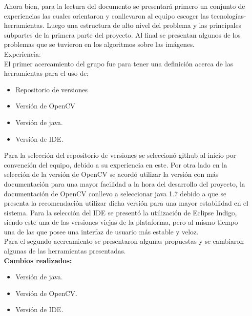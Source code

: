 \documentclass{report}
\begin{document}
Ahora bien, para la lectura del documento se presentar\'a primero un conjunto de experiencias las cuales orientaron y conllevaron al equipo escoger las tecnolog\'ias-herramientas. Luego una estructura de alto nivel del problema y las principales subpartes de la primera parte del proyecto. Al final se presentan algunos de los problemas que se tuvieron en los algoritmos sobre las im\'agenes.\\ [3 cm]

\huge  Experiencia:\\

\large 
El primer acercamiento del grupo fue para tener una definici\'on acerca de las herramientas para el uso de: \\

\begin{itemize}
\item Repositorio de versiones 
\item Versi\'on de OpenCV 
\item Versi\'on de java. 
\item Versi\'on de IDE.
\end{itemize}
 
Para la selecci\'on del repositorio de versiones se seleccion\'o github al inicio por convenci\'on del equipo, debido a su experiencia en este. Por otra lado en la selecci\'on de la versi\'on de OpenCV se acord\'o utilizar la versi\'on con m\'as documentaci\'on para una mayor facilidad a la hora del desarrollo del proyecto, la documentaci\'on de OpenCV conllevo a seleccionar java 1.7 debido a que se presenta la recomendaci\'on utilizar dicha versi\'on para una mayor estabilidad en el sistema.  
Para la selecci\'on del IDE se present\'o la utilizaci\'on de Eclipse Indigo, siendo este una de las versiones viejas de la plataforma, pero al mismo tiempo una de las que posee una interfaz de usuario m\'as estable y veloz. \\

Para el segundo acercamiento se presentaron algunas propuestas y se cambiaron algunas de las herramientas presentadas.  \\

\textbf{Cambios realizados:}
\begin{itemize}  
\item Versi\'on de java. 
\item Versi\'on de OpenCV. 
\item Versi\'on de IDE. \\
\end{itemize}
\end{document}
